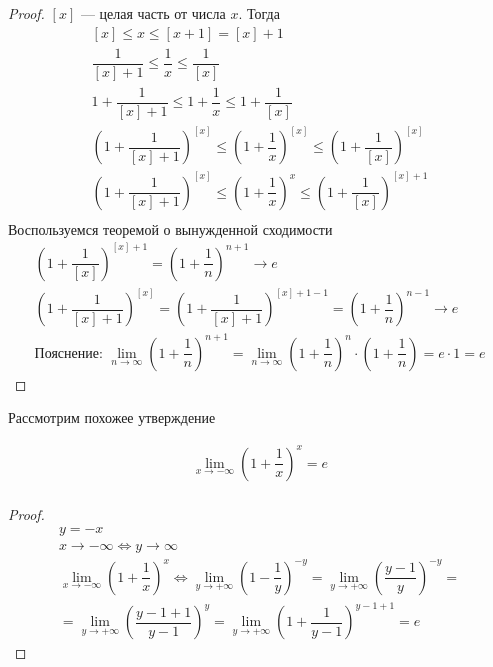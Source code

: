 \documentclass[a4paper]{article}
\theoremstyle{named}
\begin{document}
\begin{colloq}
\begin{proof}
			$[x]$ --- целая часть от числа $x$. Тогда
			\[\begin{gathered}
				[x] \leq x \leq [x + 1] = [x] + 1 \\
				\dfrac{1}{[x] + 1} \leq \dfrac{1}{x} \leq \dfrac{1}{[x]} \\
				1 + \dfrac{1}{[x] + 1} \leq 1 + \dfrac{1}{x} \leq 1 + \dfrac{1}{[x]} \\
				\left(1 + \dfrac{1}{[x] + 1}\right)^{[x]} \leq \left(1 + \dfrac{1}{x}\right)^{[x]} \leq \left(1 + \dfrac{1}{[x]}\right)^{[x]} \\
				\left(1 + \dfrac{1}{[x] + 1}\right)^{[x]} \leq \left(1 + \dfrac{1}{x}\right)^{x} \leq \left(1 + \dfrac{1}{[x]}\right)^{[x] + 1} \\
			\end{gathered}\]
			Воспользуемся теоремой о вынужденной сходимости
			\[\begin{gathered}
				\left(1 + \dfrac{1}{[x]}\right)^{[x] + 1} = \left(1 + \dfrac{1}{n}\right)^{n + 1} \rightarrow e \\
				\left(1 + \dfrac{1}{[x] + 1}\right)^{[x]} = \left(1 + \dfrac{1}{[x] + 1}\right)^{[x] + 1 - 1} = \left(1 + \dfrac{1}{n}\right)^{n - 1} \rightarrow e \\
				\text{Пояснение: } \lim_{n \to \infty} \left(1 + \dfrac{1}{n}\right)^{n + 1} = \lim_{n \to \infty} \left(1 + \dfrac{1}{n}\right)^n \cdot \left(1 + \dfrac{1}{n}\right) = e \cdot 1 = e
			\end{gathered}\]
		\end{proof}

		Рассмотрим похожее утверждение

		\begin{statement}
			\[\begin{gathered}
				\lim_{x \to -\infty} \left(1 + \dfrac{1}{x}\right)^x = e \\
			\end{gathered}\]
		\end{statement}

		\begin{proof}
			\[\begin{gathered}
				y = -x \\
				x \to -\infty \iff y \to \infty \\
				\lim_{x \to -\infty} \left(1 + \dfrac{1}{x}\right)^x \iff \lim_{y \to +\infty} \left(1 - \dfrac{1}{y}\right)^{-y} = \lim_{y \to +\infty} \left(\dfrac{y - 1}{y}\right)^{-y} = \\
				= \lim_{y \to +\infty} \left(\dfrac{y - 1 + 1}{y - 1}\right)^y
				= \lim_{y \to +\infty} \left(1 + \dfrac{1}{y - 1}\right)^{y - 1 + 1} = e
			\end{gathered}\]
		\end{proof}


\end{colloq}
\end{document}
